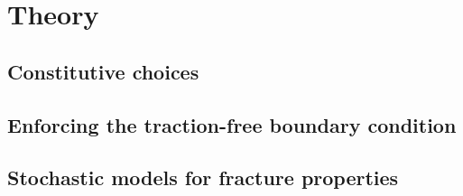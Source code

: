 \section{Theory}
\label{section: cohesive/theory}

\subsection{Constitutive choices}

\subsection{Enforcing the traction-free boundary condition}

\subsection{Stochastic models for fracture properties}
